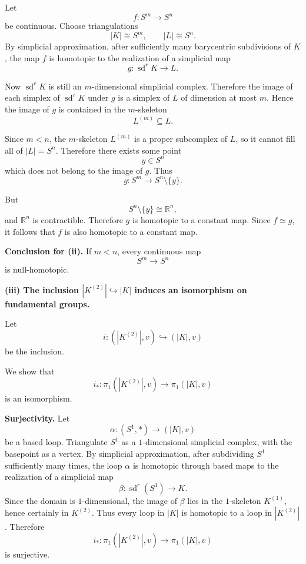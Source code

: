 \begin{solution}
Let
\[
f:S^m\to S^n
\]
be continuous. Choose triangulations
\[
|K|\cong S^m,
\qquad
|L|\cong S^n.
\]
By simplicial approximation, after sufficiently many barycentric subdivisions of \(K\), the map \(f\) is homotopic to the realization of a simplicial map
\[
g:\operatorname{sd}^r K \to L.
\]

Now \(\operatorname{sd}^r K\) is still an \(m\)-dimensional simplicial complex. Therefore the image of each simplex of \(\operatorname{sd}^r K\) under \(g\) is a simplex of \(L\) of dimension at most \(m\). Hence the image of \(g\) is contained in the \(m\)-skeleton
\[
L^{(m)} \subseteq L.
\]

Since \(m<n\), the \(m\)-skeleton \(L^{(m)}\) is a proper subcomplex of \(L\), so it cannot fill all of \(|L|=S^n\). Therefore there exists some point
\[
y\in S^n
\]
which does not belong to the image of \(g\). Thus
\[
g:S^m \to S^n\setminus \{y\}.
\]

But
\[
S^n\setminus \{y\}\cong \mathbb R^n,
\]
and \(\mathbb R^n\) is contractible. Therefore \(g\) is homotopic to a constant map. Since \(f\simeq g\), it follows that \(f\) is also homotopic to a constant map.

\par

\textbf{Conclusion for (ii).}
If \(m<n\), every continuous map
\[
S^m\to S^n
\]
is null-homotopic.

\par

\textbf{(iii) The inclusion \( |K^{(2)}| \hookrightarrow |K| \) induces an isomorphism on fundamental groups.}

Let
\[
i:(|K^{(2)}|,v)\hookrightarrow (|K|,v)
\]
be the inclusion.

We show that
\[
i_*:\pi_1(|K^{(2)}|,v)\to \pi_1(|K|,v)
\]
is an isomorphism.

\par

\textbf{Surjectivity.}
Let
\[
\alpha:(S^1,*)\to (|K|,v)
\]
be a based loop. Triangulate \(S^1\) as a \(1\)-dimensional simplicial complex, with the basepoint as a vertex. By simplicial approximation, after subdividing \(S^1\) sufficiently many times, the loop \(\alpha\) is homotopic through based maps to the realization of a simplicial map
\[
\beta:\operatorname{sd}^r(S^1)\to K.
\]
Since the domain is \(1\)-dimensional, the image of \(\beta\) lies in the \(1\)-skeleton \(K^{(1)}\), hence certainly in \(K^{(2)}\). Thus every loop in \(|K|\) is homotopic to a loop in \(|K^{(2)}|\). Therefore
\[
i_*:\pi_1(|K^{(2)}|,v)\to \pi_1(|K|,v)
\]
is surjective.


\end{solution}

